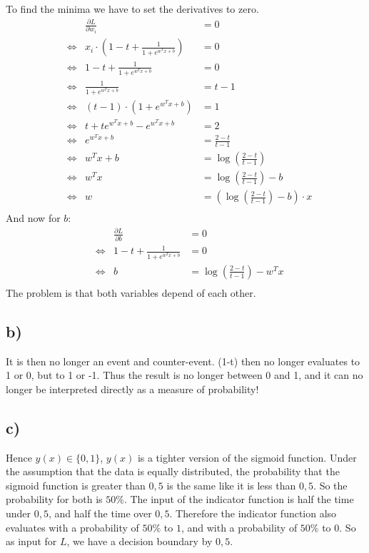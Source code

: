 \documentclass[a4paper]{article}
\begin{document}
        To find the minima we have to set the derivatives to zero.
        \begin{align}
            & & \frac{\partial L}{\partial w_i} &= 0\\
            &\Leftrightarrow & x_i \cdot \left(1 - t + \frac{1}{1 + e^{w^T x + b}}\right) &= 0\\
            &\Leftrightarrow & 1 - t + \frac{1}{1 + e^{w^T x + b}} &= 0\\
            &\Leftrightarrow & \frac{1}{1 + e^{w^T x + b}} &= t - 1\\
            &\Leftrightarrow & (t - 1) \cdot (1 + e^{w^T x + b}) &= 1\\
            &\Leftrightarrow & t + t e^{w^T x + b} - e^{w^T x + b} &= 2\\
            &\Leftrightarrow & e^{w^T x + b} &= \frac{2-t}{t-1}\\
            &\Leftrightarrow & w^T x + b &= \log\left(\frac{2-t}{t-1}\right)\\
            &\Leftrightarrow & w^T x &= \log\left(\frac{2-t}{t-1}\right) - b\\
            &\Leftrightarrow & w &= \left(\log\left(\frac{2-t}{t-1}\right) - b\right) \cdot x\\
        \end{align}
        And now for $b$:
        \begin{align}
            & & \frac{\partial L}{\partial b} &= 0\\
            &\Leftrightarrow & 1 - t + \frac{1}{1 + e^{w^T x + b}} &= 0\\
            &\Leftrightarrow & b &= \log\left(\frac{2-t}{t-1}\right) - w^T x\\
        \end{align}
        The problem is that both variables depend of each other.
        
        
    \subsection*{b)}
        It is then no longer an event and counter-event. (1-t) then no longer evaluates to 1 or 0, but to 1 or -1.
        Thus the result is no longer between 0 and 1, and it can no longer be interpreted directly as a measure of probability!
        
    
    
    \subsection*{c)}
        Hence $y(x) \in \{0,1\}$, $y(x)$ is a tighter version of the sigmoid function.
        Under the assumption that the data is equally distributed, the probability that the sigmoid function is greater than $0,5$ is the same like it is less than $0,5$.
        So the probability for both is $50\%$.
        The input of the indicator function is half the time under $0,5$, and half the time over $0,5$.
        Therefore the indicator function also evaluates with a probability of $50\%$ to $1$, and with a probability of $50\%$ to $0$.
        So as input for $L$, we have a decision boundary by $0,5$.
        
\end{document}
